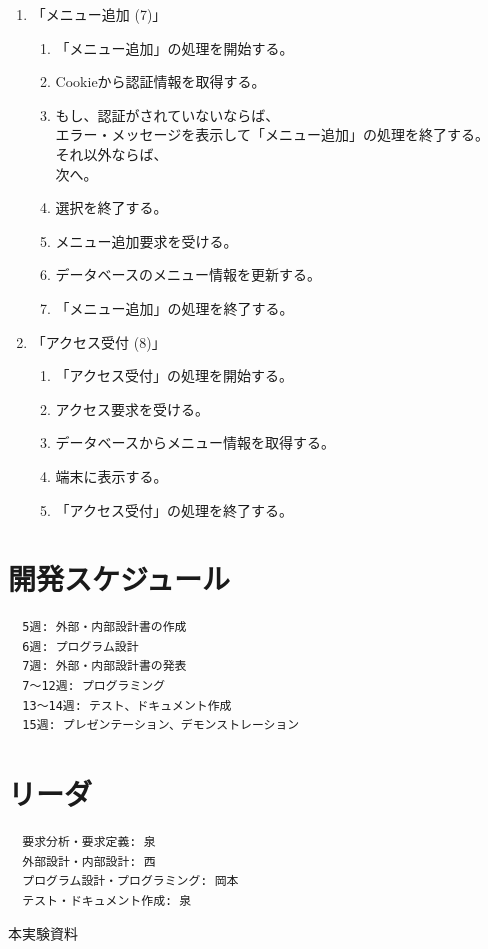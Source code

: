 \documentclass[a4paper]{jsarticle}
\begin{document}
\begin{enumerate}
\newpage

\item 「メニュー追加 (7)」
  \begin{enumerate}
    \item 「メニュー追加」の処理を開始する。
    \item Cookieから認証情報を取得する。
    \item もし、認証がされていないならば、\\
          \hspace{0.5cm} エラー・メッセージを表示して「メニュー追加」の処理を終了する。\\
          それ以外ならば、\\
          \hspace{0.5cm} 次へ。
    \item 選択を終了する。
    \item メニュー追加要求を受ける。
    \item データベースのメニュー情報を更新する。
    \item 「メニュー追加」の処理を終了する。
  \end{enumerate}
\item 「アクセス受付 (8)」
  \begin{enumerate}
    \item 「アクセス受付」の処理を開始する。
    \item アクセス要求を受ける。
    \item データベースからメニュー情報を取得する。
    \item 端末に表示する。
    \item 「アクセス受付」の処理を終了する。
  \end{enumerate}
\end{enumerate}


\section{開発スケジュール}

\begin{verbatim}
  5週: 外部・内部設計書の作成
  6週: プログラム設計
  7週: 外部・内部設計書の発表
  7〜12週: プログラミング
  13〜14週: テスト、ドキュメント作成
  15週: プレゼンテーション、デモンストレーション
\end{verbatim}

\section{リーダ}
\begin{verbatim}
  要求分析・要求定義: 泉
  外部設計・内部設計: 西
  プログラム設計・プログラミング: 岡本
  テスト・ドキュメント作成: 泉
\end{verbatim}


\begin{thebibliography}{9}
   本実験資料
\end{thebibliography}
\end{document}
